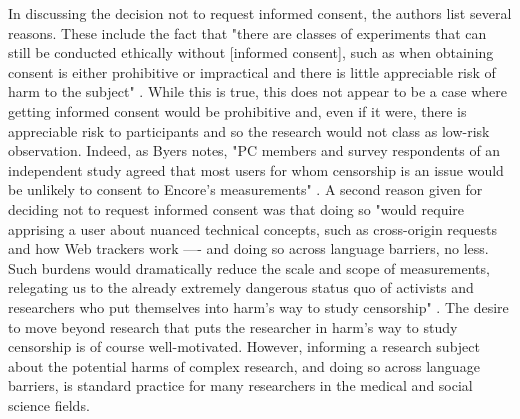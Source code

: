 \documentclass{svjour3}                     %
\begin{document}
In discussing the decision not to request informed consent, the authors list several reasons.  These include the fact that "there are classes of experiments that can still be conducted ethically without [informed consent], such as when obtaining consent is either prohibitive or impractical and there is little appreciable risk of harm to the subject" \cite[p.~664] {burnett2015encore}. While this is true, this does not appear to be a case where getting informed consent would be prohibitive and, even if it were, there is appreciable risk to participants and so the research would not class as low-risk observation.  Indeed, as Byers notes, "PC members and survey respondents of an independent study agreed that most users for whom censorship is an issue would be unlikely to consent to Encore's measurements" \cite{byers2015encore}. A second reason given for deciding not to request informed consent was that doing so "would require apprising a user about nuanced technical concepts, such as cross-origin requests and how Web trackers work —- and doing so across language barriers, no less. Such burdens would dramatically reduce the scale and scope of measurements, relegating us to the already extremely dangerous status quo of activists and researchers who put themselves into harm’s way to study censorship" \cite[p.~664] {burnett2015encore}. The desire to move beyond research that puts the researcher in harm’s way to study censorship is of course well-motivated.  However, informing a research subject about the potential harms of complex research, and doing so across language barriers, is standard practice for many researchers in the medical and social science fields.
\end{document}
